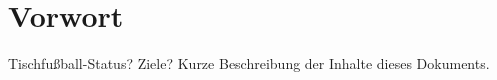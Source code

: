 \chapter*{Vorwort}

Tischfußball-Status? Ziele?
% 
Kurze Beschreibung der Inhalte dieses Dokuments.


